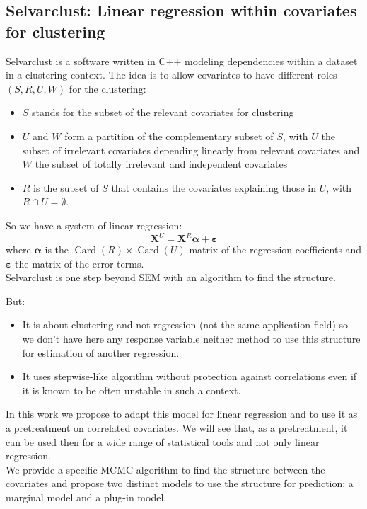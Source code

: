 \documentclass[12pt,a4paper]{report}
\begin{document}
		\subsection{Selvarclust: Linear regression within covariates for clustering}		%

			Selvarclust is a software written in C++ modeling dependencies within a dataset			 \cite{maugis2009variable} in a clustering context.
			The idea is to allow covariates to have different roles $(S,R,U,W)$ for the clustering:
			\begin{itemize}
				\item $S$ stands for the subset of the relevant covariates for clustering
				\item $U$ and $W$ form a partition of the complementary subset of $S$, with $U$ the subset of irrelevant covariates depending linearly from relevant covariates and $W$ the subset of totally irrelevant and independent covariates
				\item $R$ is the subset of $S$ that contains the covariates explaining those in $U$, with $R\cap U=\emptyset$.
\end{itemize}			 
So we have a system of linear regression:
\begin{equation}
	\boldsymbol{X}^{U}=\boldsymbol{X}^R \boldsymbol{\alpha}+ \boldsymbol{\varepsilon}
\end{equation}
where $\boldsymbol{\alpha}$ is the $\operatorname{Card}(R)\times \operatorname{Card}(U)$ matrix of the regression coefficients and $\boldsymbol{\varepsilon}$ the matrix of the error terms.\\
Selvarclust is one step beyond SEM with an algorithm to find the structure.		

			But:
			\begin{itemize}
				\item It is about clustering and not regression (not the same application field) so we don't have here any response variable neither method to use this structure for estimation of another regression. 
				\item It uses stepwise-like algorithm without protection against correlations \cite{raftery2006variable} even if it is known to be often unstable \cite{miller2002subset} in such a context.
			\end{itemize}
			
			In this work we propose to adapt this model for linear regression and to use it as a pretreatment on correlated covariates. We will see that, as a pretreatment, it can be used then for a wide range of statistical tools and not only linear regression.\\
			We provide a specific MCMC algorithm to find the structure between the covariates and propose two distinct models to use the structure for prediction: a marginal model and a plug-in model.	\\
			
\end{document}
